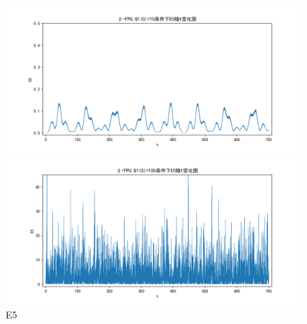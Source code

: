 \documentclass[10pt, a4paper]{article}
\begin{document}
    \begin{figure}[H]
        \begin{minipage}[t]{0.49\textwidth}
            \centering
            \includegraphics[width=\textwidth]{./q6_pics/cmp/E5.png}
        \end{minipage}
        \begin{minipage}[t]{0.49\textwidth}
            \centering
            \includegraphics[width=\textwidth]{./q6_pics/exp/E5.png}
        \end{minipage}
        \caption{E5}\label{fig:E5 in q6}
    \end{figure}
\end{document}
